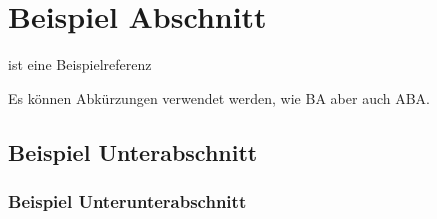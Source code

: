 \section{Beispiel Abschnitt}

\cite{latex:companion} ist eine Beispielreferenz

Es können Abkürzungen verwendet werden, wie \ac{BA} aber auch \ac{ABA}.

\subsection{Beispiel Unterabschnitt}

\subsubsection{Beispiel Unterunterabschnitt}

\Blindtext{}